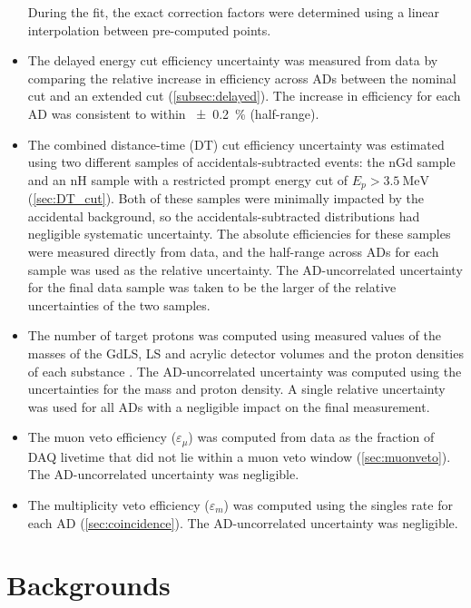 \begin{itemize}
        During the fit, the exact correction factors were determined
        using a linear interpolation between pre-computed points.
    \item The delayed energy cut efficiency uncertainty
        was measured from data by comparing the relative increase in efficiency
        across ADs between the nominal cut and an extended cut
        (\cref{subsec:delayed}).
        The increase in efficiency for each AD was consistent to within
        \SI{\pm 0.2}{\percent} (half-range).
    \item The combined distance-time (DT) cut efficiency uncertainty
        was estimated using two different samples of accidentals-subtracted events:
        the nGd sample and an nH sample with a restricted prompt energy cut
        of $E_p > \SI{3.5}{\MeV}$ (\cref{sec:DT_cut}).
        Both of these samples were minimally impacted by the accidental background,
        so the accidentals-subtracted distributions
        had negligible systematic uncertainty.
        The absolute efficiencies for these samples were measured directly from data,
        and the half-range across ADs for each sample
        was used as the relative uncertainty.
        The AD-uncorrelated uncertainty for the final data sample
        was taken to be the larger of the relative uncertainties
        of the two samples.
    \item The number of target protons was computed using measured values
        of the masses of the GdLS, LS and acrylic detector volumes
        and the proton densities of each substance \cite{nh2016technote}.
        The AD-uncorrelated uncertainty was computed
        using the uncertainties for the mass and proton density.
        A single relative uncertainty was used for all ADs
        with a negligible impact on the final measurement.
    \item The muon veto efficiency ($\varepsilon_\mu$) was computed from data
        as the fraction of DAQ livetime that did not lie within a muon veto window
        (\cref{sec:muonveto}).
        The AD-uncorrelated uncertainty was negligible.
    \item The multiplicity veto efficiency ($\varepsilon_m$) was computed
        using the singles rate for each AD (\cref{sec:coincidence}).
        The AD-uncorrelated uncertainty was negligible.
\end{itemize}

\section{Backgrounds}
\label{sec:summary_bg}

